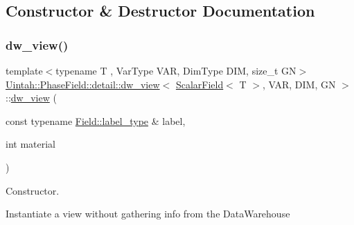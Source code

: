 \subsection{Constructor \& Destructor Documentation}
\mbox{\label{classUintah_1_1PhaseField_1_1detail_1_1dw__view_3_01ScalarField_3_01T_01_4_00_01VAR_00_01DIM_00_01GN_01_4_aa305d01f0cabaad24c3114531b5b93a9}} 
\subsubsection{\texorpdfstring{dw\+\_\+view()}{dw\_view()}\hspace{0.1cm}{\footnotesize\ttfamily [1/3]}}
{\footnotesize\ttfamily template$<$typename T , Var\+Type V\+AR, Dim\+Type D\+IM, size\+\_\+t GN$>$ \\
\hyperlink{classUintah_1_1PhaseField_1_1detail_1_1dw__view}{Uintah\+::\+Phase\+Field\+::detail\+::dw\+\_\+view}$<$ \hyperlink{structUintah_1_1PhaseField_1_1ScalarField}{Scalar\+Field}$<$ T $>$, V\+AR, D\+IM, GN $>$\+::\hyperlink{classUintah_1_1PhaseField_1_1detail_1_1dw__view}{dw\+\_\+view} (\begin{DoxyParamCaption}\item[{const typename \hyperlink{structUintah_1_1PhaseField_1_1ScalarField_a7a77875e030da64c47ce9f6c22a06959}{Field\+::label\+\_\+type} \&}]{label,  }\item[{int}]{material }\end{DoxyParamCaption})\hspace{0.3cm}{\ttfamily [inline]}}



Constructor. 

Instantiate a view without gathering info from the Data\+Warehouse


